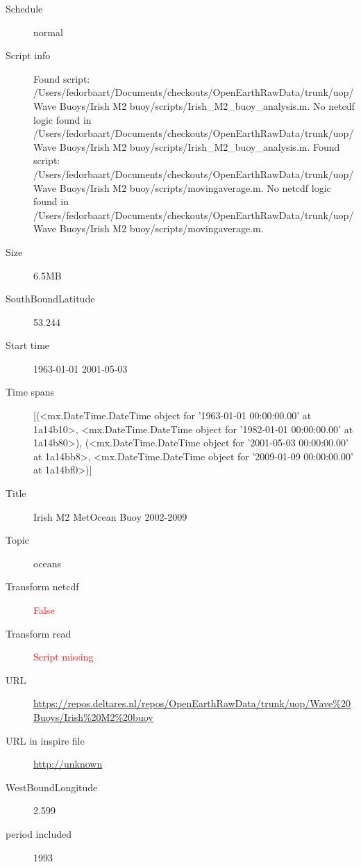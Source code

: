 \documentclass[9]{report}
\begin{document}
\begin{description}
\begin{verbatim}
\end{verbatim}
  \item[Schedule] normal
  \item[Script info] Found script: /Users/fedorbaart/Documents/checkouts/OpenEarthRawData/trunk/uop/Wave Buoys/Irish M2 buoy/scripts/Irish\_M2\_buoy\_analysis.m.
No netcdf logic found in /Users/fedorbaart/Documents/checkouts/OpenEarthRawData/trunk/uop/Wave Buoys/Irish M2 buoy/scripts/Irish\_M2\_buoy\_analysis.m.
Found script: /Users/fedorbaart/Documents/checkouts/OpenEarthRawData/trunk/uop/Wave Buoys/Irish M2 buoy/scripts/movingaverage.m.
No netcdf logic found in /Users/fedorbaart/Documents/checkouts/OpenEarthRawData/trunk/uop/Wave Buoys/Irish M2 buoy/scripts/movingaverage.m.
  \item[Size] 6.5MB
  \item[SouthBoundLatitude] 53.244
  \item[Start time] 1963-01-01 2001-05-03
  \item[Time spans] [(<mx.DateTime.DateTime object for '1963-01-01 00:00:00.00' at 1a14b10>, <mx.DateTime.DateTime object for '1982-01-01 00:00:00.00' at 1a14b80>), (<mx.DateTime.DateTime object for '2001-05-03 00:00:00.00' at 1a14bb8>, <mx.DateTime.DateTime object for '2009-01-09 00:00:00.00' at 1a14bf0>)]
  \item[Title]  Irish M2 MetOcean Buoy 2002-2009 
  \item[Topic] oceans
  \item[Transform netcdf] \textcolor{red}{False}
  \item[Transform read] \textcolor{red}{Script missing}
  \item[URL] \href{https://repos.deltares.nl/repos/OpenEarthRawData/trunk/uop/Wave\%20Buoys/Irish\%20M2\%20buoy}{https://repos.deltares.nl/repos/OpenEarthRawData/trunk/uop/Wave\%20Buoys/Irish\%20M2\%20buoy}
  \item[URL in inspire file] \href{http://unknown}{http://unknown}
  \item[WestBoundLongitude] 2.599
  \item[period included] 1993
\end{description}
\end{document}
